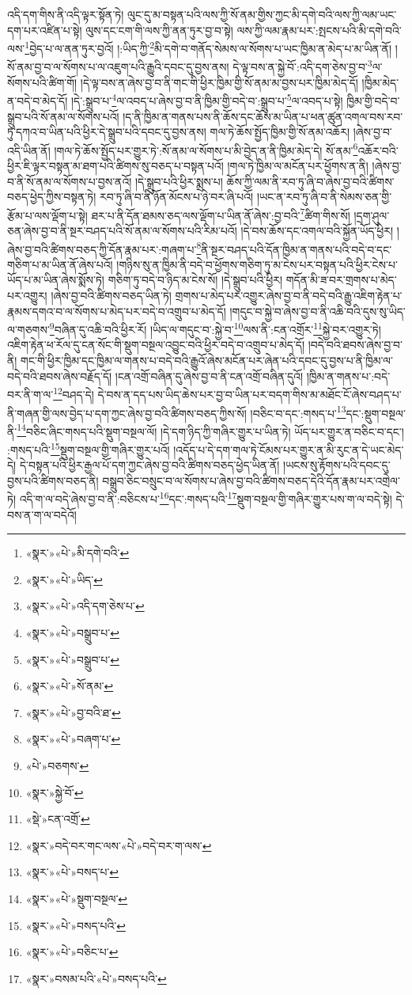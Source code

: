 འདི་དག་གིས་ནི་འདི་ལྟར་སྟོན་ཏེ། ལུང་དུ་མ་བསྟན་པའི་ལས་ཀྱི་སོ་ནམ་གྱིས་ཀྱང་མི་དགེ་བའི་ལས་ཀྱི་ལམ་ཡང་དག་པར་འཛིན་པ་སྟེ། ལུས་དང་ངག་གི་ལས་ཀྱི་ནན་ཏུར་བྱ་བ་སྟེ། ལས་ཀྱི་ལམ་རྣམ་པར་:སྤངས་པའི་མི་དགེ་བའི་ལས་\footnote{«སྣར་»«པེ་»མི་དགེ་བའི་}བྱེད་པ་ལ་ནན་ཏུར་བྱའོ། །:ཡིད་ཀྱི་\footnote{«སྣར་»«པེ་»ཡིད་}མི་དགེ་བ་གནོད་སེམས་ལ་སོགས་པ་ཡང་ཁྱིམ་ན་མེད་པ་མ་ཡིན་ནོ། །སོ་ནམ་བྱ་བ་ལ་སོགས་པ་ལ་འཇུག་པའི་རྒྱུའི་དབང་དུ་བྱས་ནས། དེ་ལྟ་བས་ན་སྐྱེ་བོ་:འདི་དག་ཅེས་བྱ་བ་\footnote{«སྣར་»«པེ་»འདི་དག་ཅེས་པ་}ལ་སོགས་པའི་ཚིག་གོ། །དེ་ལྟ་བས་ན་ཞེས་བྱ་བ་ནི་གང་གི་ཕྱིར་ཁྱིམ་གྱི་སོ་ནམ་མ་བྱས་པར་ཁྱིམ་མེད་དོ། །ཁྱིམ་མེད་ན་བདེ་བ་མེད་དོ། །དེ་:སྒྲུབ་པ་\footnote{«སྣར་»«པེ་»བསྒྲུབ་པ་}ལ་འབད་པ་ཞེས་བྱ་བ་ནི་ཁྱིམ་གྱི་བདེ་བ་:སྒྲུབ་པ་\footnote{«སྣར་»«པེ་»བསྒྲུབ་པ་}ལ་འབད་པ་སྟེ། ཁྱིམ་གྱི་བདེ་བ་སྒྲུབ་པའི་སོ་ནམ་ལ་སོགས་པའོ། །ད་ནི་ཁྱིམ་ན་གནས་པས་ནི་ཆོས་དང་ཆོས་མ་ཡིན་པ་ཕན་ཚུན་འགལ་བས་རབ་ཏུ་དཀའ་བ་ཡིན་པའི་ཕྱིར་དེ་སྒྲུབ་པའི་དབང་དུ་བྱས་ནས། གལ་ཏེ་ཆོས་སྤྱོད་ཁྱིམ་གྱི་སོ་ནམ་འཆོར། །ཞེས་བྱ་བ་འདི་ཡིན་ནོ། །གལ་ཏེ་ཆོས་སྤྱོད་པར་གྱུར་ཏེ་:སོ་ནམ་ལ་སོགས་པ་མི་བྱེད་ན་ནི་ཁྱིམ་མེད་དེ། སོ་ནམ་\footnote{«སྣར་»«པེ་»སོ་ནམ་}འཆོར་བའི་ཕྱིར་ཇི་ལྟར་བསྟན་མ་ཐག་པའི་ཚིགས་སུ་བཅད་པ་བསྟན་པའོ། །གལ་ཏེ་ཁྱིམ་ལ་མངོན་པར་ཕྱོགས་ན་ནི། །ཞེས་བྱ་བ་ནི་སོ་ནམ་ལ་སོགས་པ་བྱས་ནའོ། །དེ་སྒྲུབ་པའི་ཕྱིར་སྨྲས་པ། ཆོས་ཀྱི་ལམ་ནི་རབ་ཏུ་ཞི་བ་ཞེས་བྱ་བའི་ཚིགས་བཅད་ཕྱེད་ཀྱིས་བསྟན་ཏེ། རབ་ཏུ་ཞི་བ་ནི་ཉོན་མོངས་པ་ཉེ་བར་ཞི་པའོ། །ཡང་ན་རབ་ཏུ་ཞི་བ་ནི་སེམས་ཅན་གྱི་རྩོམ་པ་ལས་ལྡོག་པ་སྟེ། ཐར་པ་ནི་དོན་ཐམས་ཅད་ལས་ལྡོག་པ་ཡིན་ནོ་ཞེས་:བྱ་བའི་\footnote{«སྣར་»«པེ་»བྱ་བའི་ཐ་}ཚིག་གིས་སོ། །དྲག་ཤུལ་ཅན་ཞེས་བྱ་བ་ནི་སྔར་བཤད་པའི་སོ་ནམ་ལ་སོགས་པའི་རིམ་པའོ། །དེ་བས་ཆོས་དང་འགལ་བའི་སྐྱོན་ཡོད་ཕྱིར། །ཞེས་བྱ་བའི་ཚིགས་བཅད་ཀྱི་དོན་རྣམ་པར་:གཞག་པ་\footnote{«སྣར་»«པེ་»བཞག་པ་}ནི་སྔར་བཤད་པའི་དོན་ཁྱིམ་ན་གནས་པའི་བདེ་བ་དང་གཅིག་པ་མ་ཡིན་ནོ་ཞེས་པའོ། །གཉིས་སུ་ན་ཁྱིམ་ནི་བདེ་བ་ཕྱོགས་གཅིག་ཏུ་མ་ངེས་པར་བསྟན་པའི་ཕྱིར་ངེས་པ་ཡོད་པ་མ་ཡིན་ཞེས་སྨོས་ཏེ། གཅིག་ཏུ་བདེ་བ་ཉིད་མ་ངེས་སོ། །དེ་སྒྲུབ་པའི་ཕྱིར། གདོན་མི་ཟ་བར་གྲགས་པ་མེད་པར་འགྱུར། །ཞེས་བྱ་བའི་ཚིགས་བཅད་ཡིན་ཏེ། གྲགས་པ་མེད་པར་འགྱུར་ཞེས་བྱ་བ་ནི་བདེ་བའི་རྒྱུ་འཇིག་རྟེན་པ་རྣམས་དགའ་བ་ལ་སོགས་པ་མེད་པར་བདེ་བ་འགྲུབ་པ་མེད་དོ། །གདུང་བ་སྐྱེ་བ་ཞེས་བྱ་བ་ནི་འཆི་བའི་དུས་སུ་ཡིད་ལ་གཅགས་\footnote{«པེ་»བཅགས་}བཞིན་དུ་འཆི་བའི་ཕྱིར་རོ། །ཡིད་ལ་གདུང་བ་:སྐྱེ་བ་\footnote{«སྣར་»སྐྱེ་བོ་}ལས་ནི་:ངན་འགྲོར་\footnote{«སྡེ་»ངན་འགྲོ་}སྐྱེ་བར་འགྱུར་ཏེ། འཇིག་རྟེན་ཕ་རོལ་དུ་ངན་སོང་གི་སྡུག་བསྔལ་འབྱུང་བའི་ཕྱིར་བདེ་བ་འགྲུབ་པ་མེད་དོ། །བདེ་བའི་ཐབས་ཞེས་བྱ་བ་ནི། གང་གི་ཕྱིར་ཁྱིམ་དང་ཁྱིམ་ལ་གནས་པ་བདེ་བའི་རྒྱུའོ་ཞེས་མངོན་པར་ཞེན་པའི་དབང་དུ་བྱས་པ་ནི་ཁྱིམ་ལ་བདེ་བའི་ཐབས་ཞེས་བརྗོད་དོ། །ངན་འགྲོ་བཞིན་དུ་ཞེས་བྱ་བ་ནི་ངན་འགྲོ་བཞིན་དུའོ། །ཁྱིམ་ན་གནས་པ་:བདེ་བར་ནི་ག་ལ་\footnote{«སྣར་»བདེ་བར་གང་ལས་«པེ་»བདེ་བར་ག་ལས་}བཤད་དེ། དེ་བས་ན་དད་པས་ཡིད་ཆེས་པར་བྱ་བ་ཡིན་པར་བདག་གིས་མ་མཐོང་ངོ་ཞེས་བཤད་པ་ནི་གཞན་གྱི་ལས་བྱེད་པ་དག་ཀྱང་ཞེས་བྱ་བའི་ཚིགས་བཅད་ཀྱིས་སོ། །བཅིང་བ་དང་:གསད་པ་\footnote{«སྣར་»«པེ་»བསད་པ་}དང་:སྡུག་བསྔལ་ནི་\footnote{«སྣར་»«པེ་»སྡུག་བསྔལ་}བཅིང་ཞིང་གསད་པའི་སྡུག་བསྔལ་ལོ། །དེ་དག་ཉིད་ཀྱི་གཞིར་གྱུར་པ་ཡིན་ཏེ། ཡོད་པར་གྱུར་ན་བཅིང་བ་དང་། :གསད་པའི་\footnote{«སྣར་»«པེ་»བསད་པའི་}སྡུག་བསྔལ་གྱི་གཞིར་གྱུར་པའོ། །འདོད་པ་དེ་དག་གལ་ཏེ་ངོམས་པར་གྱུར་ན་མི་རུང་ན་དེ་ཡང་མེད་དེ། དེ་བསྟན་པའི་ཕྱིར་རྒྱལ་པོ་དག་ཀྱང་ཞེས་བྱ་བའི་ཚིགས་བཅད་ཕྱེད་ཡིན་ནོ། །ཡངས་སུ་རྟོགས་པའི་དབང་དུ་བྱས་པའི་ཚིགས་བཅད་ནི། བསྒྲུབ་ཅིང་བསྲུང་བ་ལ་སོགས་པ་ཞེས་བྱ་བའི་ཚིགས་བཅད་དེའི་དོན་རྣམ་པར་འགྲེལ་ཏེ། འདི་ག་ལ་བདེ་ཞེས་བྱ་བ་ནི་:བཅིངས་པ་\footnote{«སྣར་»«པེ་»བཅིང་པ་}དང་:གསད་པའི་\footnote{«སྣར་»བསམ་པའི་«པེ་»བསད་པའི་}སྡུག་བསྔལ་གྱི་གཞིར་གྱུར་པས་ག་ལ་བདེ་སྟེ། དེ་བས་ན་ག་ལ་བདེའོ། 